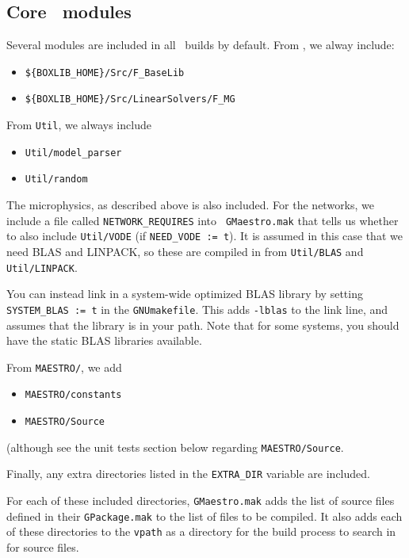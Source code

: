 \subsection{Core \maestro\ modules}

Several modules are included in all \maestro\ builds by default.
From \boxlib, we alway include:
\begin{itemize}
\item {\tt \$\{BOXLIB\_HOME\}/Src/F\_BaseLib}
\item {\tt \$\{BOXLIB\_HOME\}/Src/LinearSolvers/F\_MG}
\end{itemize}

\noindent From {\tt Util}, we always include
\begin{itemize}
\item {\tt Util/model\_parser}
\item {\tt Util/random}
\end{itemize}

The microphysics, as described above is also included.  For the
networks, we include a file called {\tt NETWORK\_REQUIRES} into {\tt
  GMaestro.mak} that tells us whether to also include {\tt Util/VODE}
(if {\tt NEED\_VODE := t}).  It is assumed in this case that we need
BLAS and LINPACK, so these are compiled in from {\tt Util/BLAS}  and
{\tt Util/LINPACK}.  

You can instead link in a system-wide optimized BLAS library by setting
{\tt SYSTEM\_BLAS := t} in the {\tt GNUmakefile}.  This adds {\tt -lblas}
to the link line, and assumes that the library is in your path.  Note
that for some systems, you should have the static BLAS libraries 
available. 


From {\tt MAESTRO/}, we add
\begin{itemize}
\item {\tt MAESTRO/constants}
\item {\tt MAESTRO/Source}
\end{itemize}
(although see the unit tests section below regarding {\tt MAESTRO/Source}.

\noindent Finally, any extra directories listed in the {\tt EXTRA\_DIR}
variable are included.

For each of these included directories, {\tt GMaestro.mak} adds the
list of source files defined in their {\tt GPackage.mak} to the list
of files to be compiled.  It also adds each of these directories to
the {\tt vpath} as a directory for the build process to search in for
source files.


